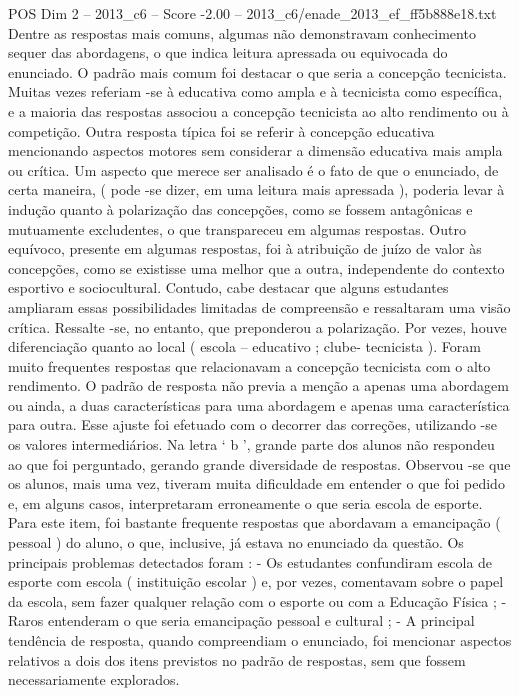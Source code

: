 \begin{textsample}{POS Dim 2 – 2013\_c6 – Score -2.00 – 2013\_c6/enade\_2013\_ef\_ff5b888e18.txt}
Dentre as respostas mais comuns, algumas não demonstravam conhecimento sequer das abordagens, o que indica leitura apressada ou equivocada do enunciado.
O padrão mais comum foi destacar o que seria a concepção tecnicista.
Muitas vezes referiam -se à educativa como ampla e à tecnicista como específica, e a maioria das respostas associou a concepção tecnicista ao alto rendimento ou à competição.
Outra resposta típica foi se referir à concepção educativa mencionando aspectos motores sem considerar a dimensão educativa mais ampla ou crítica.
Um aspecto que merece ser analisado é o fato de que o enunciado, de certa maneira, ( pode -se dizer, em uma leitura mais apressada ), poderia levar à indução quanto à polarização das concepções, como se fossem antagônicas e mutuamente excludentes, o que transpareceu em algumas respostas.
Outro equívoco, presente em algumas respostas, foi à atribuição de juízo de valor às concepções, como se existisse uma melhor que a outra, independente do contexto esportivo e sociocultural.
Contudo, cabe destacar que alguns estudantes ampliaram essas possibilidades limitadas de compreensão e ressaltaram uma visão crítica.
Ressalte -se, no entanto, que preponderou a polarização.
Por vezes, houve diferenciação quanto ao local ( escola – educativo ; clube- tecnicista ).
Foram muito frequentes respostas que relacionavam a concepção tecnicista com o alto rendimento.
O padrão de resposta não previa a menção a apenas uma abordagem ou ainda, a duas características para uma abordagem e apenas uma característica para outra.
Esse ajuste foi efetuado com o decorrer das correções, utilizando -se os valores intermediários.
Na letra ‘ b ’, grande parte dos alunos não respondeu ao que foi perguntado, gerando grande diversidade de respostas.
Observou -se que os alunos, mais uma vez, tiveram muita dificuldade em entender o que foi pedido e, em alguns casos, interpretaram erroneamente o que seria escola de esporte.
Para este item, foi bastante frequente respostas que abordavam a emancipação ( pessoal ) do aluno, o que, inclusive, já estava no enunciado da questão.
Os principais problemas detectados foram : - Os estudantes confundiram escola de esporte com escola ( instituição escolar ) e, por vezes, comentavam sobre o papel da escola, sem fazer qualquer relação com o esporte ou com a Educação Física ; - Raros entenderam o que seria emancipação pessoal e cultural ; - A principal tendência de resposta, quando compreendiam o enunciado, foi mencionar aspectos relativos a dois dos itens previstos no padrão de respostas, sem que fossem necessariamente explorados.

\end{textsample}
